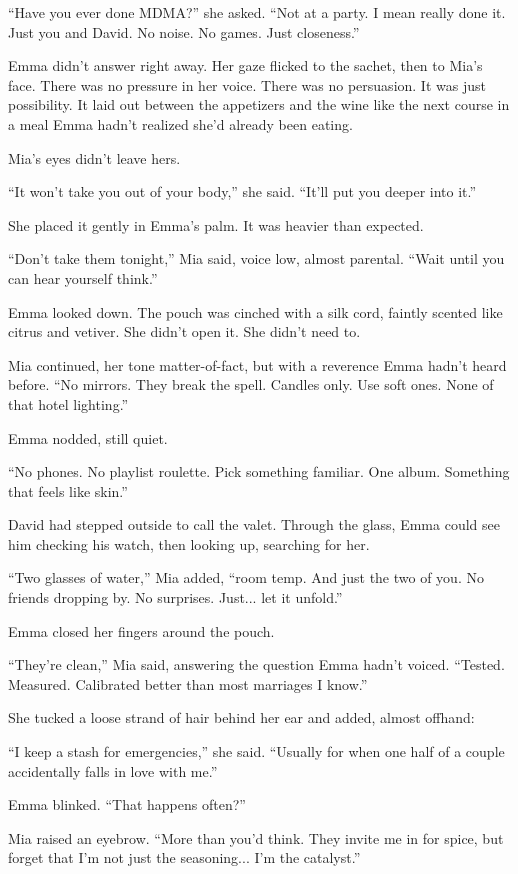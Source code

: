 ``Have you ever done MDMA?'' she asked. ``Not at a party. I mean really done it. Just you and 
David. No noise. 
No games. Just closeness.''

Emma didn’t answer right away. Her gaze flicked to the sachet, then to Mia’s face. There was 
no pressure in 
her voice. There was no persuasion. It was just possibility. It laid out between the appetizers 
and the wine 
like the next course in a meal Emma hadn’t realized she’d already been eating.

Mia’s eyes didn’t leave hers.

``It won’t take you out of your body,'' she said. ``It’ll put you deeper into it.''

She placed it gently in Emma’s palm. It was heavier than expected.

``Don’t take them tonight,'' Mia said, voice low, almost parental. ``Wait until
you can hear yourself think.''

Emma looked down. The pouch was cinched with a silk cord, faintly scented like
citrus and vetiver. She didn’t open it. She didn’t need to.

Mia continued, her tone matter-of-fact, but with a reverence Emma hadn’t heard
before. ``No mirrors. They break the spell. Candles only. Use soft ones. None of
that hotel lighting.''

Emma nodded, still quiet.

``No phones. No playlist roulette. Pick something familiar. One album. Something
that feels like skin.''

David had stepped outside to call the valet. Through the glass, Emma could see
him checking his watch, then looking up, searching for her.

``Two glasses of water,'' Mia added, ``room temp. And just the two of you. No
friends dropping by. No surprises. Just... let it unfold.''

Emma closed her fingers around the pouch.

``They’re clean,'' Mia said, answering the question Emma hadn’t voiced. ``Tested.
Measured. Calibrated better than most marriages I know.''

She tucked a loose strand of hair behind her ear and added, almost offhand:

``I keep a stash for emergencies,'' she said. ``Usually for when one half of a
couple accidentally falls in love with me.''

Emma blinked. ``That happens often?''

Mia raised an eyebrow. ``More than you'd think. They invite me in for spice,
but forget that I'm not just the seasoning... I'm the catalyst.''

